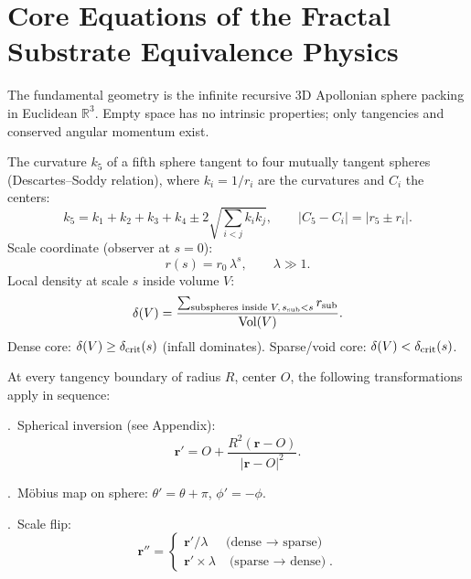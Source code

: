 \documentclass[11pt,letterpaper]{article}
\begin{document}
\section{Core Equations of the Fractal Substrate Equivalence Physics}
\label{sec:core_equations}
The fundamental geometry is the infinite recursive 3D Apollonian sphere packing in
Euclidean $\mathbb{R}^3$. Empty space has no intrinsic properties; only tangencies
and conserved angular momentum exist.

The curvature $k_5$ of a fifth sphere tangent to four mutually tangent spheres
(Descartes--Soddy relation), where $k_i = 1/r_i$ are the curvatures and $C_i$ the
centers:
\begin{equation}
k_5 = k_1+k_2+k_3+k_4 \pm 2\sqrt{\sum_{i<j}k_i k_j},\qquad
|C_5-C_i|=|r_5\pm r_i|.
\label{eq:soddy}
\end{equation}
Scale coordinate (observer at $s{=}0$):
\begin{equation}
r(s)=r_0\,\lambda^s,\qquad\lambda\gg 1.
\label{eq:scale}
\end{equation}
Local density at scale $s$ inside volume $V$:
\begin{equation}
\delta(V)=\frac{\sum_{\text{subspheres inside }V,\,s_{\rm sub}<s}r_{\rm sub}}
{\mathrm{Vol}(V)}.
\label{eq:density}
\end{equation}
Dense core: $\delta(V)\ge\delta_{\rm crit}(s)$ (infall dominates).
Sparse/void core: $\delta(V)<\delta_{\rm crit}(s)$.

At every tangency boundary of radius $R$, center $O$, the following transformations
apply in sequence:

.\ Spherical inversion (see Appendix):
\begin{equation}
\mathbf{r}'=O+\frac{R^2(\mathbf{r}-O)}{|\mathbf{r}-O|^2}.
\end{equation}

.\ M\"obius map on sphere: $\theta'=\theta+\pi$, $\phi'=-\phi$.

.\ Scale flip:
\begin{equation}
\mathbf{r}''=
\begin{cases}
\mathbf{r}'/\lambda & \text{(dense $\to$ sparse)}\\
\mathbf{r}'\times\lambda & \text{(sparse $\to$ dense)}.
\end{cases}
\end{equation}
\end{document}
